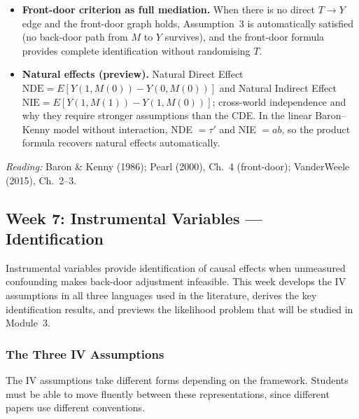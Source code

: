 \documentclass[12pt]{article}
\begin{document}
\begin{itemize}
  \item \textbf{Front-door criterion as full mediation.}
    When there is no direct $T \to Y$ edge and the front-door graph holds,
    Assumption~3 is automatically satisfied (no back-door path from $M$
    to $Y$ survives), and the front-door formula provides complete
    identification without randomising $T$.

  \item \textbf{Natural effects (preview).}
    Natural Direct Effect
    $\mathrm{NDE} = E[Y(1, M(0)) - Y(0, M(0))]$ and Natural Indirect Effect
    $\mathrm{NIE} = E[Y(1, M(1)) - Y(1, M(0))]$;
    cross-world independence and why they require stronger assumptions
    than the CDE. In the linear Baron--Kenny model without interaction,
    NDE $= \tau'$ and NIE $= ab$, so the product formula recovers
    natural effects automatically.
\end{itemize}

\noindent\textit{Reading:} Baron \& Kenny (1986);
Pearl (2000), Ch.~4 (front-door); VanderWeele (2015), Ch.~2--3.

\subsection{Week 7: Instrumental Variables --- Identification}

Instrumental variables provide identification of causal effects when
unmeasured confounding makes back-door adjustment infeasible.  This week
develops the IV assumptions in all three languages used in the literature,
derives the key identification results, and previews the likelihood problem
that will be studied in Module~3.

\subsubsection*{The Three IV Assumptions}

The IV assumptions take different forms depending on the framework.
Students must be able to move fluently between these representations,
since different papers use different conventions.
\end{document}
